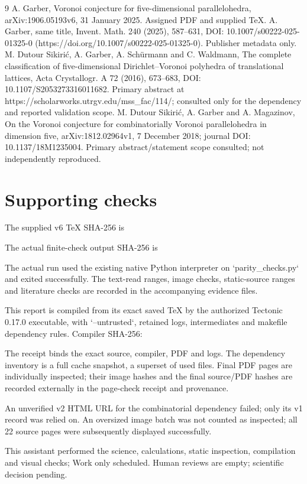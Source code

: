 \documentclass[10pt]{article}
\begin{document}
9 A. Garber, Voronoi conjecture for five-dimensional parallelohedra, arXiv:1906.05193v6, 31 January 2025. Assigned PDF and supplied TeX. A. Garber, same title, Invent. Math. 240 (2025), 587–631, DOI: 10.1007/s00222-025-01325-0 (https://doi.org/10.1007/s00222-025-01325-0). Publisher metadata only. M. Dutour Sikirić, A. Garber, A. Schürmann and C. Waldmann, The complete classification of five-dimensional Dirichlet–Voronoi polyhedra of translational lattices, Acta Crystallogr. A 72 (2016), 673–683, DOI: 10.1107/S2053273316011682. Primary abstract at https://scholarworks.utrgv.edu/mss\_fac/114/; consulted only for the dependency and reported validation scope. M. Dutour Sikirić, A. Garber and A. Magazinov, On the Voronoi conjecture for combinatorially Voronoi parallelohedra in dimension five, arXiv:1812.02964v1, 7 December 2018; journal DOI: 10.1137/18M1235004. Primary abstract/statement scope consulted; not independently reproduced.\par
\section*{Supporting checks}
The supplied v6 TeX SHA-256 is\par
The actual finite-check output SHA-256 is\par
The actual run used the existing native Python interpreter on `parity\_checks.py` and exited successfully. The text-read ranges, image checks, static-source ranges and literature checks are recorded in the accompanying evidence files.\par
This report is compiled from its exact saved TeX by the authorized Tectonic 0.17.0 executable, with `–untrusted`, retained logs, intermediates and makefile dependency rules. Compiler SHA-256:\par
The receipt binds the exact source, compiler, PDF and logs. The dependency inventory is a full cache snapshot, a superset of used files. Final PDF pages are individually inspected; their image hashes and the final source/PDF hashes are recorded externally in the page-check receipt and provenance.\par
An unverified v2 HTML URL for the combinatorial dependency failed; only its v1 record was relied on. An oversized image batch was not counted as inspected; all 22 source pages were subsequently displayed successfully.\par
This assistant performed the science, calculations, static inspection, compilation and visual checks; Work only scheduled. Human reviews are empty; scientific decision pending.\par
\end{document}
